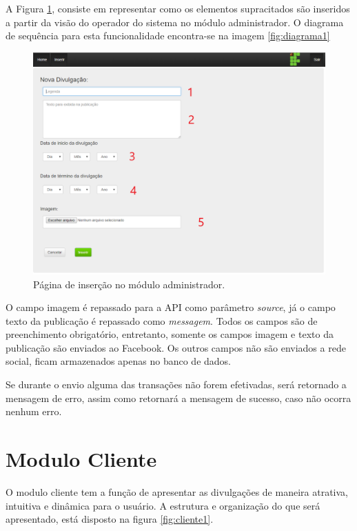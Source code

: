 A Figura \ref{fig:administrador1}, consiste em representar como os elementos supracitados são inseridos a partir da visão do operador do sistema no módulo administrador. O diagrama de sequência para esta funcionalidade encontra-se na imagem \ref{fig:diagrama1}
 
\begin{figure}[H]
\centering
\includegraphics[scale=0.5]{figuras/administrador1}
\caption{Página de inserção no módulo administrador.}
\label{fig:administrador1}
\end{figure}



O campo imagem é repassado para a API como parâmetro \textit{source}, já o campo texto da publicação é repassado como \textit{messagem}. Todos os campos são de preenchimento obrigatório, entretanto, somente os campos imagem e texto da publicação são enviados ao Facebook. Os outros campos não são enviados a rede social, ficam armazenados apenas no banco de dados.

Se durante o envio alguma das transações não forem efetivadas, será retornado a mensagem de erro, assim como retornará a mensagem de sucesso, caso não ocorra nenhum erro.

\section{Modulo Cliente}
O modulo cliente tem a função de apresentar as divulgações de maneira atrativa, intuitiva e dinâmica para o usuário. A estrutura e organização do que será apresentado, está disposto na  figura \ref{fig:cliente1}.

